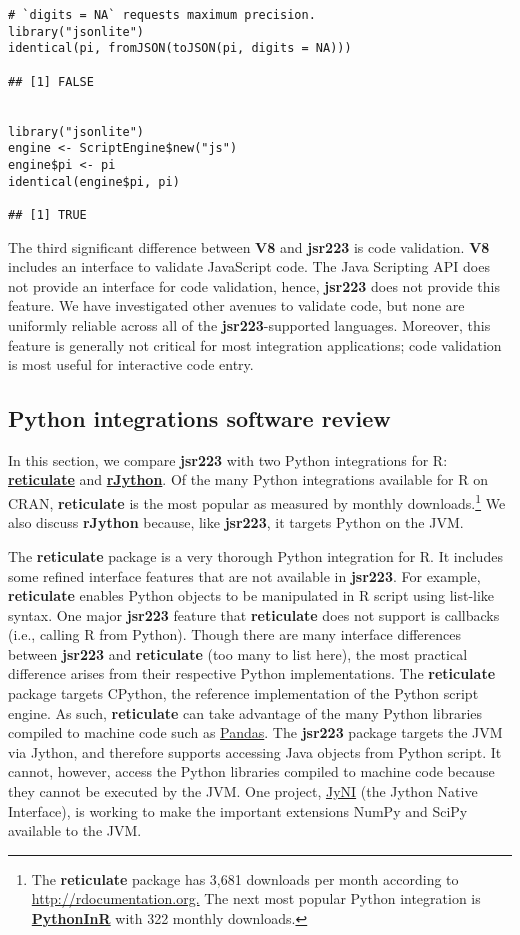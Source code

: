 \documentclass[
article,
11pt, %
a4paper, %
oneside, %
headinclude,footinclude, %
]{scrartcl}
\theoremstyle{definition} %
\theoremstyle{plain} %
\theoremstyle{remark} %
\newcommand{\pkg}[1]{\textbf{#1}}
\newcommand{\CRANpkg}[1]{\href{https://CRAN.R-project.org/package=#1}{\pkg{#1}}}
\begin{document}
\begin{verbatim}
# `digits = NA` requests maximum precision.
library("jsonlite")
identical(pi, fromJSON(toJSON(pi, digits = NA)))

## [1] FALSE


library("jsonlite")
engine <- ScriptEngine$new("js")
engine$pi <- pi
identical(engine$pi, pi)

## [1] TRUE
\end{verbatim}

The third significant difference between \pkg{V8} and \pkg{jsr223} is code validation. \pkg{V8} includes an interface to validate JavaScript code. The Java Scripting API does not provide an interface for code validation, hence, \pkg{jsr223} does not provide this feature. We have investigated other avenues to validate code, but none are uniformly reliable across all of the \pkg{jsr223}-supported languages. Moreover, this feature is generally not critical for most integration applications; code validation is most useful for interactive code entry.

\hypertarget{python-integrations}{}
\subsection{Python integrations software review}

In this section, we compare \pkg{jsr223} with two Python integrations for R: \CRANpkg{reticulate} and \CRANpkg{rJython}. Of the many Python integrations available for R on CRAN, \pkg{reticulate} is the most popular as measured by monthly downloads.\footnote{The \pkg{reticulate} package has 3,681 downloads per month according to \href{http://rdocumentation.org}{http://rdocumentation.org.} The next most popular Python integration is \CRANpkg{PythonInR} with 322 monthly downloads.} We also discuss \pkg{rJython} because, like \pkg{jsr223}, it targets Python on the JVM.

The \pkg{reticulate} package is a very thorough Python integration for R. It includes some refined interface features that are not available in \pkg{jsr223}. For example, \pkg{reticulate} enables Python objects to be manipulated in R script using list-like syntax. One major \pkg{jsr223} feature that \pkg{reticulate} does not support is callbacks (i.e., calling R from Python). Though there are many interface differences between \pkg{jsr223} and \pkg{reticulate} (too many to list here), the most practical difference arises from their respective Python implementations. The \pkg{reticulate} package targets CPython, the reference implementation of the Python script engine. As such, \pkg{reticulate} can take advantage of the many Python libraries compiled to machine code such as \href{https://pandas.pydata.org/}{Pandas}. The \pkg{jsr223} package targets the JVM via Jython, and therefore supports accessing Java objects from Python script. It cannot, however, access the Python libraries compiled to machine code because they cannot be executed by the JVM. One project, \href{http://www.jyni.org/}{JyNI} (the Jython Native Interface), is working to make the important extensions NumPy and SciPy available to the JVM. %
\end{document}
